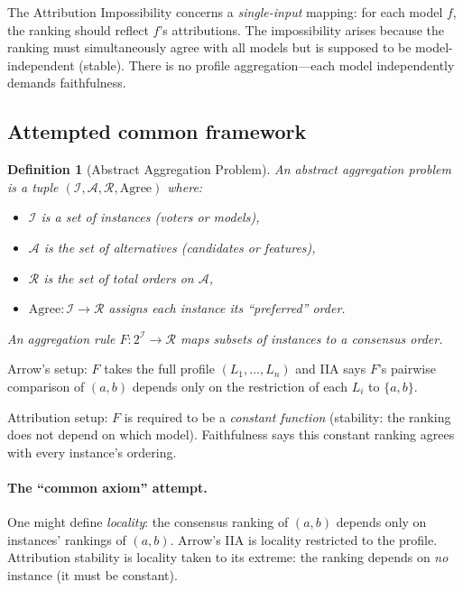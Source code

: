 \documentclass{article}
\newtheorem{definition}[theorem]{Definition}
\begin{document}
The Attribution Impossibility concerns a \emph{single-input} mapping:
for each model $f$, the ranking should reflect $f$'s attributions.
The impossibility arises because the ranking must simultaneously
agree with all models but is supposed to be model-independent (stable).
There is no profile aggregation---each model independently demands
faithfulness.

\subsection{Attempted common framework}

\begin{definition}[Abstract Aggregation Problem]
An \emph{abstract aggregation problem} is a tuple
$(\mathcal{I}, \mathcal{A}, \mathcal{R}, \text{Agree})$ where:
\begin{itemize}
    \item $\mathcal{I}$ is a set of \emph{instances} (voters or models),
    \item $\mathcal{A}$ is the set of alternatives (candidates or features),
    \item $\mathcal{R}$ is the set of total orders on $\mathcal{A}$,
    \item $\text{Agree} \colon \mathcal{I} \to \mathcal{R}$ assigns each
      instance its ``preferred'' order.
\end{itemize}
An \emph{aggregation rule} $F \colon 2^{\mathcal{I}} \to \mathcal{R}$
maps subsets of instances to a consensus order.
\end{definition}

Arrow's setup: $F$ takes the full profile $(L_1, \ldots, L_n)$ and
IIA says $F$'s pairwise comparison of $(a,b)$ depends only on the
restriction of each $L_i$ to $\{a,b\}$.

Attribution setup: $F$ is required to be a \emph{constant function}
(stability: the ranking does not depend on which model). Faithfulness
says this constant ranking agrees with every instance's ordering.

\paragraph{The ``common axiom'' attempt.}
One might define \emph{locality}: the consensus ranking of $(a,b)$
depends only on instances' rankings of $(a,b)$. Arrow's IIA is
locality restricted to the profile. Attribution stability is locality
taken to its extreme: the ranking depends on \emph{no} instance
(it must be constant).
\end{document}

